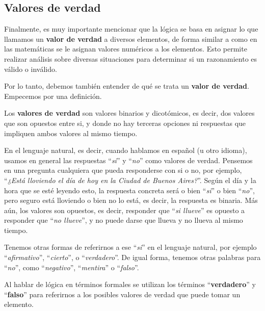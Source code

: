 \subsection{Valores de verdad}
\label{chap:logica:subsec:valores_de_verdad}

Finalmente, es muy importante mencionar que la lógica se basa en asignar lo que
llamamos un \textbf{valor de verdad} a diversos elementos, de forma similar a
como en las matemáticas se le asignan valores numéricos a los elementos. Esto
permite realizar análisis sobre diversas situaciones para determinar si un
razonamiento es válido o inválido.

Por lo tanto, debemos también entender de qué se trata un \textbf{valor de
verdad}. Empecemos por una definición.

\begin{definition} Los \textbf{valores de verdad} son
    valores binarios y dicotómicos, es  decir, dos valores que son opuestos
    entre si, y donde no hay terceras opciones ni respuestas que impliquen ambos
    valores al mismo tiempo.
\end{definition}

En el lenguaje natural, es decir, cuando hablamos en español (u otro idioma),
usamos en general las respuestas ``\textit{si}'' y ``\textit{no}'' como valores
de verdad. Pensemos en una pregunta cualquiera que pueda responderse con si o
no, por ejemplo, ``\textit{¿Está lloviendo el día de hoy en la Ciudad de Buenos
Aires?}''. Según el día y la hora que se esté leyendo esto, la respuesta
concreta será o bien ``\textit{si}'' o bien ``\textit{no}'', pero seguro está
lloviendo o bien no lo está, es decir, la respuesta es binaria. Más aún, los
valores son opuestos, es decir, responder que ``\textit{si llueve}'' es opuesto
a responder que ``\textit{no llueve}'', y no puede darse que llueva y no llueva
al mismo tiempo.

Tenemos otras formas de referirnos a ese ``\textit{si}'' en el lenguaje natural,
por ejemplo ``\textit{afirmativo}'', ``\textit{cierto}'', o
``\textit{verdadero}''. De igual forma, tenemos otras palabras para
``\textit{no}'', como ``\textit{negativo}'', ``\textit{mentira}'' o
``\textit{falso}''.

Al hablar de lógica en términos formales se utilizan los términos
``\textbf{verdadero}'' y ``\textbf{falso}'' para
referirnos a los posibles valores de verdad que puede tomar un elemento.

